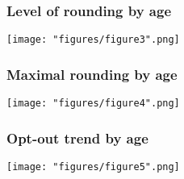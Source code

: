 \documentclass[10pt,svgnames,fragile]{beamer}
\begin{document}
\begin{frame}[label = figure2]
	\frametitle{Level of rounding by age} 
	\begin{center}
		\texttt{[image: "figures/figure3".png]}
	\end{center}
	\hyperlink{Framework2}{}
\end{frame}

\begin{frame}[label = figure3]
	\frametitle{Maximal rounding by age} 
	\begin{center}
		\texttt{[image: "figures/figure4".png]}
	\end{center}
	\hyperlink{Framework2}{}
\end{frame}

\begin{frame}[label = figure4]
	\frametitle{Opt-out trend by age} 
	\begin{center}
		\texttt{[image: "figures/figure5".png]}
	\end{center}
	\hyperlink{Framework2}{}
\end{frame}
\end{document}
